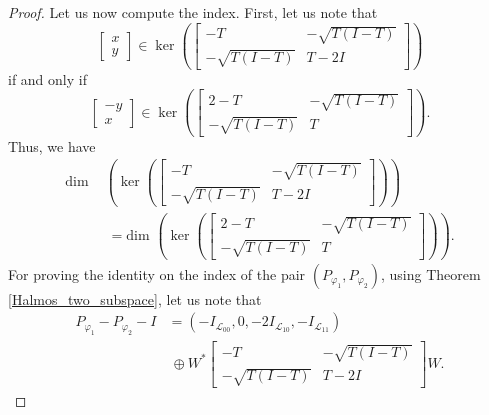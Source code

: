 \documentclass[12pt, a4 paper]{amsart}
\newcommand{\cll}{\mathcal{L}}
\theoremstyle{definition}
\theoremstyle{plain}
\theoremstyle{definition}
\numberwithin{equation}{section}
\let\phi=\varphi
\begin{document}
\begin{proof}
Let us now compute the index. First, let us note that
$$\begin{bmatrix}
            x\\
            y
        \end{bmatrix}\in \ker(\begin{bmatrix}
            {-T} & {-\sqrt{T(I-T)}}\\
            {-\sqrt{T(I-T)}} & {T-2I}
        \end{bmatrix})$$ if and only if $$\begin{bmatrix}
            -y\\
            x
        \end{bmatrix}\in 
        \ker(\begin{bmatrix}
            {2-T} & {-\sqrt{T(I-T)}}\\
            {-\sqrt{T(I-T)}} & {T}
        \end{bmatrix}).$$ Thus, we have
        \begin{align*}
            \text{dim }&(\ker(\begin{bmatrix}
            {-T} & {-\sqrt{T(I-T)}}\\
            {-\sqrt{T(I-T)}} & {T-2I}
        \end{bmatrix}))\\
        &~=\text{dim }(\ker(\begin{bmatrix}
            {2-T} & {-\sqrt{T(I-T)}}\\
            {-\sqrt{T(I-T)}} & {T}
        \end{bmatrix})).
        \end{align*}
        For proving the identity on the index of the pair $(P_{\phi_1}, P_{\phi_2})$, using Theorem \ref{Halmos_two_subspace}, let us note that
        \begin{equation}\label{eqns1}
     \begin{split}
            {P_{\phi_1}-P_{\phi_2}-I}&=(-I_{\cll_{00}},0,-2I_{\cll_{10}},-I_{\cll_{11}})\\
            &~\oplus {W}^*\begin{bmatrix}
            {-T} & {-\sqrt{T(I-T)}}\\
            {-\sqrt{T(I-T)}} & {T-2I}
        \end{bmatrix}{W}.
        \end{split}
        \end{equation}
        

\end{proof}
\end{document}
